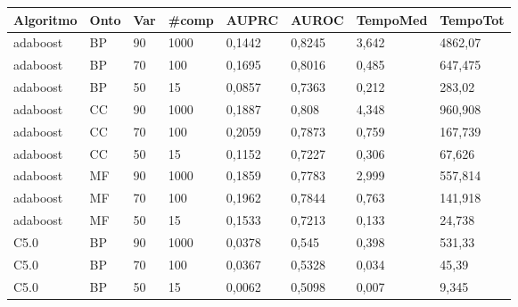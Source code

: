 \documentclass[12pt]{report}
\begin{document}
\begin{appendices}
\begin{longtable}[h]{|l|l|l|l|l|l|l|l|}
\hline
\textbf{Algoritmo} & \textbf{Onto} & \textbf{Var} & \textbf{\#comp} & \textbf{AUPRC} & \textbf{AUROC} & \textbf{TempoMed} & \textbf{TempoTot} \\ \hline
adaboost           & BP            & 90                & 1000               & 0,1442         & 0,8245         & 3,642                    & 4862,07              \\ \hline
adaboost           & BP            & 70                & 100                & 0,1695         & 0,8016         & 0,485                    & 647,475              \\ \hline
adaboost           & BP            & 50                & 15                 & 0,0857         & 0,7363         & 0,212                    & 283,02               \\ \hline
adaboost           & CC            & 90                & 1000               & 0,1887         & 0,808          & 4,348                    & 960,908              \\ \hline
adaboost           & CC            & 70                & 100                & 0,2059         & 0,7873         & 0,759                    & 167,739              \\ \hline
adaboost           & CC            & 50                & 15                 & 0,1152         & 0,7227         & 0,306                    & 67,626               \\ \hline
adaboost           & MF            & 90                & 1000               & 0,1859         & 0,7783         & 2,999                    & 557,814              \\ \hline
adaboost           & MF            & 70                & 100                & 0,1962         & 0,7844         & 0,763                    & 141,918              \\ \hline
adaboost           & MF            & 50                & 15                 & 0,1533         & 0,7213         & 0,133                    & 24,738               \\ \hline
C5.0               & BP            & 90                & 1000               & 0,0378         & 0,545          & 0,398                    & 531,33               \\ \hline
C5.0               & BP            & 70                & 100                & 0,0367         & 0,5328         & 0,034                    & 45,39                \\ \hline
C5.0               & BP            & 50                & 15                 & 0,0062         & 0,5098         & 0,007                    & 9,345                \\ \hline

\end{longtable}
\end{appendices}
\end{document}
